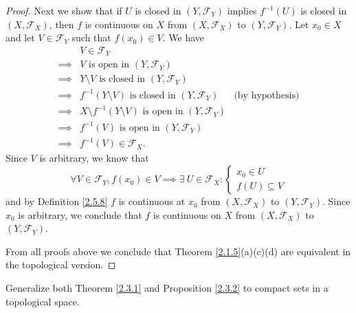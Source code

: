 \begin{proof}
    Next we show that if \(U\) is closed in \((Y, \mathcal{F}_Y)\) implies \(f^{-1}(U)\) is closed in \((X, \mathcal{F}_X)\), then \(f\) is continuous on \(X\) from \((X, \mathcal{F}_X)\) to \((Y, \mathcal{F}_Y)\).
    Let \(x_0 \in X\) and let \(V \in \mathcal{F}_Y\) such that \(f(x_0) \in V\).
    We have
    \begin{align*}
                 & V \in \mathcal{F}_Y                                                                               \\
        \implies & V \text{ is open in } (Y, \mathcal{F}_Y)                                                          \\
        \implies & Y \setminus V \text{ is closed in } (Y, \mathcal{F}_Y)                                            \\
        \implies & f^{-1}(Y \setminus V) \text{ is closed in } (Y, \mathcal{F}_Y)           & \text{(by hypothesis)} \\
        \implies & X \setminus f^{-1}(Y \setminus V) \text{ is open in } (Y, \mathcal{F}_Y)                          \\
        \implies & f^{-1}(V) \text{ is open in } (Y, \mathcal{F}_Y)                                                  \\
        \implies & f^{-1}(V) \in \mathcal{F}_X.
    \end{align*}
    Since \(V\) is arbitrary, we know that
    \[
        \forall V \in \mathcal{F}_Y, f(x_0) \in V \implies \exists\ U \in \mathcal{F}_X : \begin{cases}
            x_0 \in U \\
            f(U) \subseteq V
        \end{cases}
    \]
    and by Definition \ref{2.5.8} \(f\) is continuous at \(x_0\) from \((X, \mathcal{F}_X)\) to \((Y, \mathcal{F}_Y)\).
    Since \(x_0\) is arbitrary, we conclude that \(f\) is continuous on \(X\) from \((X, \mathcal{F}_X)\) to \((Y, \mathcal{F}_Y)\).

    From all proofs above we conclude that Theorem \ref{2.1.5}(a)(c)(d) are equivalent in the topological version.
\end{proof}

\begin{exercise}\label{ex 2.5.17}
    Generalize both Theorem \ref{2.3.1} and Proposition \ref{2.3.2} to compact sets in a topological space.
\end{exercise}

